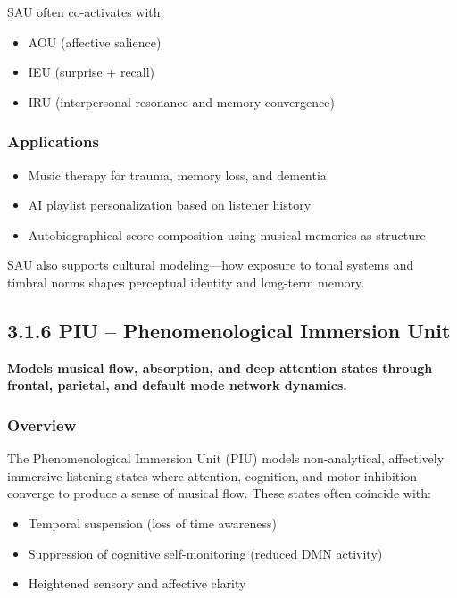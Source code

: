 SAU often co-activates with:

\begin{itemize}
    \item AOU (affective salience)
    \item IEU (surprise + recall)
    \item IRU (interpersonal resonance and memory convergence)
\end{itemize}

\subsubsection*{Applications}

\begin{itemize}
    \item Music therapy for trauma, memory loss, and dementia
    \item AI playlist personalization based on listener history
    \item Autobiographical score composition using musical memories as structure
\end{itemize}

SAU also supports cultural modeling—how exposure to tonal systems and timbral norms shapes perceptual identity and long-term memory.

\subsection*{3.1.6 PIU – Phenomenological Immersion Unit}

\textbf{Models musical flow, absorption, and deep attention states through frontal, parietal, and default mode network dynamics.}

\subsubsection*{Overview}

The Phenomenological Immersion Unit (PIU) models non-analytical, affectively immersive listening states where attention, cognition, and motor inhibition converge to produce a sense of musical flow. These states often coincide with:

\begin{itemize}
    \item Temporal suspension (loss of time awareness)
    \item Suppression of cognitive self-monitoring (reduced DMN activity)
    \item Heightened sensory and affective clarity
\end{itemize}


